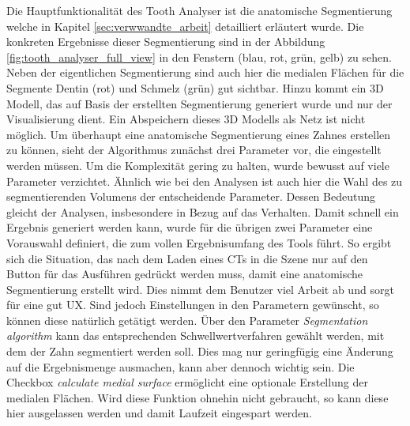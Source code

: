 Die Hauptfunktionalität des Tooth Analyser ist die anatomische Segmentierung welche
in Kapitel \ref{sec:verwwandte_arbeit} detailliert erläutert wurde. Die
konkreten Ergebnisse dieser Segmentierung sind in der Abbildung
\ref{fig:tooth_analyser_full_view} in den Fenstern (blau, rot, grün, gelb) zu sehen.
Neben der eigentlichen Segmentierung sind auch hier die medialen Flächen für die
Segmente Dentin (rot) und Schmelz (grün) gut sichtbar. Hinzu kommt ein \ac{3D}
Modell, das auf Basis der erstellten Segmentierung generiert wurde und nur der Visualisierung
dient. Ein Abspeichern dieses 3D Modells als Netz ist nicht möglich. Um überhaupt
eine anatomische Segmentierung eines Zahnes erstellen zu können, sieht der
Algorithmus zunächst drei Parameter vor, die eingestellt werden müssen. Um die
Komplexität gering zu halten, wurde bewusst auf viele Parameter verzichtet.
Ähnlich wie bei den Analysen ist auch hier die Wahl des zu segmentierenden
Volumens der entscheidende Parameter. Dessen Bedeutung gleicht der Analysen,
insbesondere in Bezug auf das Verhalten. Damit schnell ein Ergebnis generiert werden
kann, wurde für die übrigen zwei Parameter eine Vorauswahl definiert, die zum vollen
Ergebnisumfang des Tools führt. So ergibt sich die Situation, das nach dem Laden
eines \ac{CT}s in die Szene nur auf den Button für das Ausführen gedrückt werden
muss, damit eine anatomische Segmentierung erstellt wird. Dies nimmt dem Benutzer
viel Arbeit ab und sorgt für eine gut \ac{UX}. Sind jedoch Einstellungen in den Parametern
gewünscht, so können diese natürlich getätigt werden. Über den Parameter \textit{Segmentation
algorithm} kann das entsprechenden Schwellwertverfahren gewählt werden, mit dem der
Zahn segmentiert werden soll. Dies mag nur geringfügig eine Änderung auf die
Ergebnismenge ausmachen, kann aber dennoch wichtig sein. Die Checkbox \textit{calculate
medial surface} ermöglicht eine optionale Erstellung der medialen Flächen. Wird
diese Funktion ohnehin nicht gebraucht, so kann diese hier ausgelassen werden und
damit Laufzeit eingespart werden.

